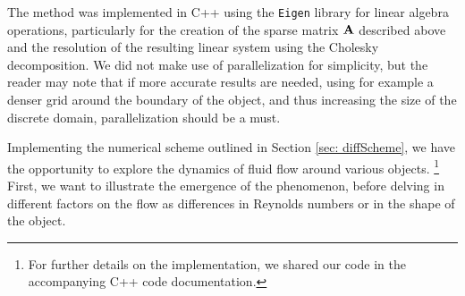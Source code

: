 The method was implemented in C++ using the \texttt{Eigen} library for linear algebra operations, particularly for the creation of the sparse matrix $\boldsymbol{\mathrm{A}}$ described above and the resolution of the resulting linear system using the Cholesky decomposition. We did not make use of parallelization for simplicity, but the reader may note that if more accurate results are needed, using for example a denser grid around the boundary of the object, and thus increasing the size of the discrete domain, parallelization should be a must.

Implementing the numerical scheme outlined in Section \ref{sec: diffScheme}, we have the opportunity to explore the dynamics of fluid flow around various objects. \footnote{For further details on the implementation, we shared our code in the accompanying C++ code documentation.} First, we want to illustrate the emergence of the phenomenon, before delving in different factors on the flow as differences in Reynolds numbers or in the shape of the object.

